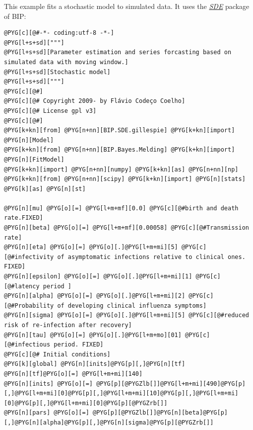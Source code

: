 \documentclass[a4paper,10pt,english]{manual}
\begin{document}
This example fits a stochastic model to simulated data. It uses the \hyperlink{sde}{\emph{SDE}} package of BIP:

\begin{Verbatim}[commandchars=@\[\]]
@PYG[c][@#-*- coding:utf-8 -*-]
@PYG[l+s+sd]["""]
@PYG[l+s+sd][Parameter estimation and series forcasting based on simulated data with moving window.]
@PYG[l+s+sd][Stochastic model]
@PYG[l+s+sd]["""]
@PYG[c][@#]
@PYG[c][@# Copyright 2009- by Flávio Codeço Coelho]
@PYG[c][@# License gpl v3]
@PYG[c][@#]
@PYG[k+kn][from] @PYG[n+nn][BIP.SDE.gillespie] @PYG[k+kn][import] @PYG[n][Model]
@PYG[k+kn][from] @PYG[n+nn][BIP.Bayes.Melding] @PYG[k+kn][import] @PYG[n][FitModel]
@PYG[k+kn][import] @PYG[n+nn][numpy] @PYG[k+kn][as] @PYG[n+nn][np]
@PYG[k+kn][from] @PYG[n+nn][scipy] @PYG[k+kn][import] @PYG[n][stats] @PYG[k][as] @PYG[n][st]

@PYG[n][mu] @PYG[o][=] @PYG[l+m+mf][0.0] @PYG[c][@#birth and death rate.FIXED]
@PYG[n][beta] @PYG[o][=] @PYG[l+m+mf][0.00058] @PYG[c][@#Transmission rate]
@PYG[n][eta] @PYG[o][=] @PYG[o][.]@PYG[l+m+mi][5] @PYG[c][@#infectivity of asymptomatic infections relative to clinical ones. FIXED]
@PYG[n][epsilon] @PYG[o][=] @PYG[o][.]@PYG[l+m+mi][1] @PYG[c][@#latency period ]
@PYG[n][alpha] @PYG[o][=] @PYG[o][.]@PYG[l+m+mi][2] @PYG[c][@#Probability of developing clinical influenza symptoms]
@PYG[n][sigma] @PYG[o][=] @PYG[o][.]@PYG[l+m+mi][5] @PYG[c][@#reduced risk of re-infection after recovery]
@PYG[n][tau] @PYG[o][=] @PYG[o][.]@PYG[l+m+mo][01] @PYG[c][@#infectious period. FIXED]
@PYG[c][@# Initial conditions]
@PYG[k][global] @PYG[n][inits]@PYG[p][,]@PYG[n][tf]
@PYG[n][tf]@PYG[o][=] @PYG[l+m+mi][140]
@PYG[n][inits] @PYG[o][=] @PYG[p][@PYGZlb[]]@PYG[l+m+mi][490]@PYG[p][,]@PYG[l+m+mi][0]@PYG[p][,]@PYG[l+m+mi][10]@PYG[p][,]@PYG[l+m+mi][0]@PYG[p][,]@PYG[l+m+mi][0]@PYG[p][@PYGZrb[]]
@PYG[n][pars] @PYG[o][=] @PYG[p][@PYGZlb[]]@PYG[n][beta]@PYG[p][,]@PYG[n][alpha]@PYG[p][,]@PYG[n][sigma]@PYG[p][@PYGZrb[]]



\end{Verbatim}
\end{document}
